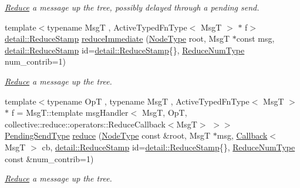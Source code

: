 \begin{DoxyCompactItemize}
\begin{DoxyCompactList}\small\item\em \hyperlink{structvt_1_1collective_1_1reduce_1_1_reduce}{Reduce} a message up the tree, possibly delayed through a pending send. \end{DoxyCompactList}\item 
{\footnotesize template$<$typename MsgT , Active\+Typed\+Fn\+Type$<$ Msg\+T $>$ $\ast$ f$>$ }\\\hyperlink{namespacevt_1_1collective_1_1reduce_1_1detail_aacc1fcd729d934ba143fee3a943bf9e7}{detail\+::\+Reduce\+Stamp} \hyperlink{structvt_1_1collective_1_1reduce_1_1_reduce_ae21e839a2347ee8ac5ee37c09ff6f4ff}{reduce\+Immediate} (\hyperlink{namespacevt_a866da9d0efc19c0a1ce79e9e492f47e2}{Node\+Type} root, MsgT $\ast$const msg, \hyperlink{namespacevt_1_1collective_1_1reduce_1_1detail_aacc1fcd729d934ba143fee3a943bf9e7}{detail\+::\+Reduce\+Stamp} id=\hyperlink{namespacevt_1_1collective_1_1reduce_1_1detail_aacc1fcd729d934ba143fee3a943bf9e7}{detail\+::\+Reduce\+Stamp}\{\}, \hyperlink{structvt_1_1collective_1_1reduce_1_1_reduce_a6c3e63aca10c31d2823b0b18cf9762a4}{Reduce\+Num\+Type} num\+\_\+contrib=1)
\begin{DoxyCompactList}\small\item\em \hyperlink{structvt_1_1collective_1_1reduce_1_1_reduce}{Reduce} a message up the tree. \end{DoxyCompactList}\item 
{\footnotesize template$<$typename OpT , typename MsgT , Active\+Typed\+Fn\+Type$<$ Msg\+T $>$ $\ast$ f = Msg\+T\+::template msg\+Handler$<$      Msg\+T, Op\+T, collective\+::reduce\+::operators\+::\+Reduce\+Callback$<$\+Msg\+T$>$    $>$$>$ }\\\hyperlink{structvt_1_1collective_1_1reduce_1_1_reduce_a0474b491f3c93014d9a0ce0356c6bfd5}{Pending\+Send\+Type} \hyperlink{structvt_1_1collective_1_1reduce_1_1_reduce_a3630a98801fa91fd9a0e5ffdf8731650}{reduce} (\hyperlink{namespacevt_a866da9d0efc19c0a1ce79e9e492f47e2}{Node\+Type} const \&root, MsgT $\ast$msg, \hyperlink{namespacevt_a36db99df4c973d48b1118a293fff533f}{Callback}$<$ MsgT $>$ cb, \hyperlink{namespacevt_1_1collective_1_1reduce_1_1detail_aacc1fcd729d934ba143fee3a943bf9e7}{detail\+::\+Reduce\+Stamp} id=\hyperlink{namespacevt_1_1collective_1_1reduce_1_1detail_aacc1fcd729d934ba143fee3a943bf9e7}{detail\+::\+Reduce\+Stamp}\{\}, \hyperlink{structvt_1_1collective_1_1reduce_1_1_reduce_a6c3e63aca10c31d2823b0b18cf9762a4}{Reduce\+Num\+Type} const \&num\+\_\+contrib=1)
\begin{DoxyCompactList}\small\item\em \hyperlink{structvt_1_1collective_1_1reduce_1_1_reduce}{Reduce} a message up the tree. \end{DoxyCompactList}\item 

\end{DoxyCompactItemize}
